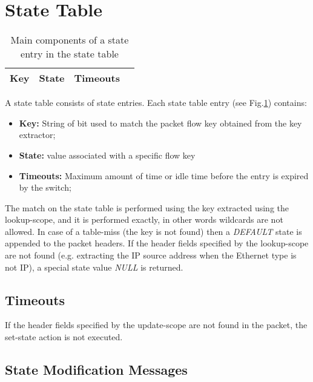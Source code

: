 \section{State Table}

\begin{table}[h]
    \centering
    \begin{tabular}{| c | c | c | c |}
        \hline
        Key & State & Timeouts \\
        \hline
    \end{tabular}
    \caption{Main components of a state entry in the state table}
    \label{t:state-entry}
\end{table}

A state table consists of state entries. Each state table entry (see Fig.\ref{t:state-entry}) contains:

\begin{itemize}
    \item \textbf{Key:} String of bit used to match the packet flow key obtained from the key extractor;
    \item \textbf{State:} value associated with a specific flow key
    \item\textbf{Timeouts:} Maximum amount of time or idle time before the entry is expired by the switch;
\end{itemize}

The match on the state table is performed using the key extracted using the lookup-scope, and it is performed exactly, in other words wildcards are not allowed. In case of a table-miss (the key is not found) then a \emph{DEFAULT} state is appended to the packet headers. If the header fields specified by the lookup-scope are not found (e.g. extracting the IP source address when the Ethernet type is not IP), a special state value \emph{NULL} is returned.


\subsection{Timeouts}


If the header fields specified by the update-scope are not found in the packet, the set-state action is not executed.

\subsection{State Modification Messages}

